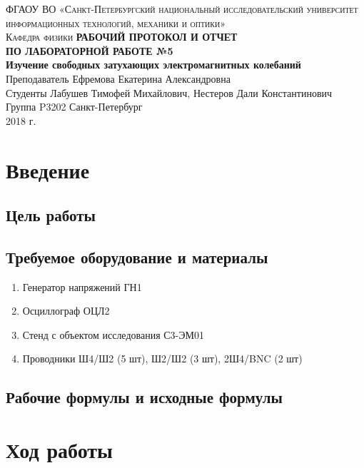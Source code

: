 \documentclass[12pt, a4paper]{article}
\begin{document}
\begin{titlepage}

\noindent\textsc{ФГАОУ ВО «Санкт-Петербургский национальный исследовательский
университет информационных технологий, механики и оптики»\\[4mm]
Кафедра физики}
\vfill
\noindent\textbf{РАБОЧИЙ ПРОТОКОЛ И ОТЧЕТ\\[2mm]
ПО ЛАБОРАТОРНОЙ РАБОТЕ №5\\[4mm]
Изучение свободных затухающих электромагнитных колебаний}\\[16mm]
Преподаватель Ефремова Екатерина Александровна\\[2mm]
Студенты Лабушев Тимофей Михайлович, Нестеров Дали Константинович\\[2mm]
Группа P3202
\vfill
\noindent Санкт-Петербург\\[2mm]
2018 г.

\end{titlepage}

\section*{Введение}

\subsection*{Цель работы}

\subsection*{Требуемое оборудование и материалы}

\begin{enumerate}
\item Генератор напряжений ГН1
\item Осциллограф ОЦЛ2
\item Стенд с объектом исследования С3-ЭМ01
\item Проводники Ш4/Ш2 (5 шт), Ш2/Ш2 (3 шт), 2Ш4/BNC (2 шт)
\end{enumerate}

\subsection*{Рабочие формулы и исходные формулы}

\section*{Ход работы}
\end{document}
